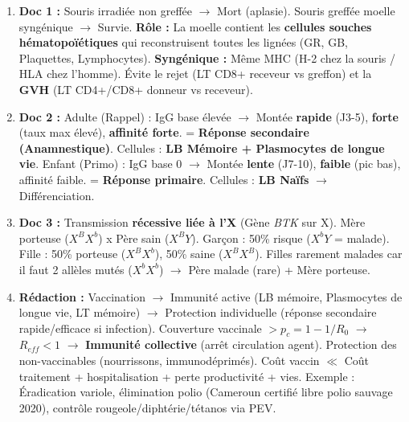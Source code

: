 \documentclass[11pt]{article}
\begin{document}
\begin{corrige}
\begin{enumerate}
    \item \textbf{Doc 1 :} Souris irradiée non greffée $\rightarrow$ Mort (aplasie). Souris greffée moelle syngénique $\rightarrow$ Survie. \textbf{Rôle :} La moelle contient les \textbf{cellules souches hématopoïétiques} qui reconstruisent toutes les lignées (GR, GB, Plaquettes, Lymphocytes). \textbf{Syngénique :} Même MHC (H-2 chez la souris / HLA chez l'homme). Évite le rejet (LT CD8+ receveur vs greffon) et la \textbf{GVH} (LT CD4+/CD8+ donneur vs receveur).
    \item \textbf{Doc 2 :} Adulte (Rappel) : IgG base élevée $\rightarrow$ Montée \textbf{rapide} (J3-5), \textbf{forte} (taux max élevé), \textbf{affinité forte}. = \textbf{Réponse secondaire (Anamnestique)}. Cellules : \textbf{LB Mémoire + Plasmocytes de longue vie}. Enfant (Primo) : IgG base 0 $\rightarrow$ Montée \textbf{lente} (J7-10), \textbf{faible} (pic bas), affinité faible. = \textbf{Réponse primaire}. Cellules : \textbf{LB Naïfs} $\rightarrow$ Différenciation.
    \item \textbf{Doc 3 :} Transmission \textbf{récessive liée à l'X} (Gène \textit{BTK} sur X). Mère porteuse ($X^B X^b$) x Père sain ($X^B Y$). Garçon : 50\% risque ($X^b Y$ = malade). Fille : 50\% porteuse ($X^B X^b$), 50\% saine ($X^B X^B$). Filles rarement malades car il faut 2 allèles mutés ($X^b X^b$) $\rightarrow$ Père malade (rare) + Mère porteuse.
    \item \textbf{Rédaction :} Vaccination $\rightarrow$ Immunité active (LB mémoire, Plasmocytes de longue vie, LT mémoire) $\rightarrow$ Protection individuelle (réponse secondaire rapide/efficace si infection). Couverture vaccinale $> p_c = 1-1/R_0$ $\rightarrow$ $R_{eff} < 1$ $\rightarrow$ \textbf{Immunité collective} (arrêt circulation agent). Protection des non-vaccinables (nourrissons, immunodéprimés). Coût vaccin $\ll$ Coût traitement + hospitalisation + perte productivité + vies. Exemple : Éradication variole, élimination polio (Cameroun certifié libre polio sauvage 2020), contrôle rougeole/diphtérie/tétanos via PEV.
\end{enumerate}
\end{corrige}
\end{document}
